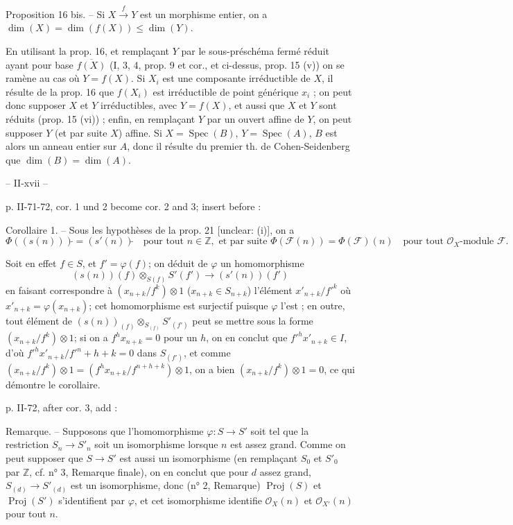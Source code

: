 Proposition 16 bis. -- Si $X \xrightarrow{f} Y$ est un morphisme entier, on a $\dim(X) = \dim(f(X)) \le \dim(Y)$.

En utilisant la prop. 16, et remplaçant $Y$ par le sous-préschéma fermé réduit ayant pour base $\overline{f(X)}$ (I, 3, 4, prop. 9 et cor., et ci-dessus, prop. 15 (v)) on se ramène au cas où $Y = f(X)$. Si $X_i$ est une composante irréductible de $X$, il résulte de la prop. 16 que $f(X_i)$ est irréductible de point générique $x_i$ ; on peut donc supposer $X$ et $Y$ irréductibles, avec $Y = f(X)$, et aussi que $X$ et $Y$ sont réduits (prop. 15 (vi)) ; enfin, en remplaçant $Y$ par un ouvert affine de $Y$, on peut supposer $Y$ (et par suite $X$) affine. Si $X = \operatorname{Spec}(B)$, $Y = \operatorname{Spec}(A)$, $B$ est alors un anneau entier sur $A$, donc il résulte du premier th. de Cohen-Seidenberg que $\dim(B) = \dim(A)$.

\newpage


\begin{center}
-- II-xvii --
\end{center}

p. II-71-72, cor. 1 und 2 become cor. 2 and 3; insert before :

\noindent Corollaire 1. -- Sous les hypothèses de la prop. 21 [unclear: (i)], on a
$$\Phi((s(n)))\tilde{} = (s'(n))\tilde{} \quad \text{pour tout } n \in \mathbb{Z}, \text{ et par suite } \Phi(\mathcal{F}(n)) = \Phi(\mathcal{F})(n) \quad \text{pour tout } \mathcal{O}_X\text{-module } \mathcal{F}.$$

\noindent Soit en effet $f \in S$, et $f' = \varphi(f)$; on déduit de $\varphi$ un homomorphisme
$$(s(n))(f) \otimes_{S(f)} S'(f') \to (s'(n))(f')$$
en faisant correspondre à $(x_{n+k}/f^k) \otimes 1$ ($x_{n+k} \in S_{n+k}$) l'élément
$x'_{n+k}/f'^k$ où $x'_{n+k} = \varphi(x_{n+k})$; cet homomorphisme est surjectif puisque
$\varphi$ l'est ; en outre, tout élément de $(s(n))_{(f)} \otimes_{S_{(f)}} S'_{(f')}$ peut se
mettre sous la forme $(x_{n+k}/f^k) \otimes 1$; si on a $f^h x_{n+k} = 0$
pour un $h$, on en conclut que $f'^h x'_{n+k} \in I$, d'où $f'^h x'_{n+k}/f'^n+h+k = 0$
dans $S_{(f')}$, et comme $(x_{n+k}/f^k) \otimes 1 = (f^h x_{n+k}/f^{n+h+k}) \otimes 1$,
on a bien $(x_{n+k}/f^k) \otimes 1 = 0$, ce qui démontre le corollaire.

\noindent p. II-72, after cor. 3, add :

\noindent Remarque. -- Supposons que l'homomorphisme $\varphi : S \to S'$ soit tel que
la restriction $S_n \to S'_n$ soit un isomorphisme lorsque $n$ est assez grand.
Comme on peut supposer que $S \to S'$ est aussi un isomorphisme (en remplaçant $S_0$ et $S'_0$ par $\mathbb{Z}$, cf. n° 3, Remarque finale), on en conclut
que pour $d$ assez grand, $S_{(d)} \to S'_{(d)}$ est un isomorphisme, donc (n°
2, Remarque) $\operatorname{Proj}(S)$ et $\operatorname{Proj}(S')$ s'identifient par $\varphi$, et cet
isomorphisme identifie $\mathcal{O}_X(n)$ et $\mathcal{O}_{X'}(n)$ pour tout $n$.

